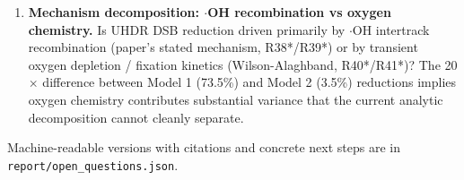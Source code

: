 \begin{enumerate}
  \item \textbf{Mechanism decomposition: $\cdot$OH recombination vs oxygen
        chemistry.} Is UHDR DSB reduction driven primarily by $\cdot$OH
        intertrack recombination (paper's stated mechanism, R38*/R39*) or by
        transient oxygen depletion / fixation kinetics (Wilson-Alaghband,
        R40*/R41*)? The 20$\times$ difference between Model 1 (73.5\%) and
        Model 2 (3.5\%) reductions implies oxygen chemistry contributes
        substantial variance that the current analytic decomposition cannot
        cleanly separate.
\end{enumerate}

Machine-readable versions with citations and concrete next steps are in
\texttt{report/open\_questions.json}.
